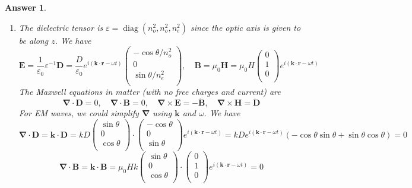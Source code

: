 \documentclass[a4paper]{article}
\DeclareMathOperator{\diag}{diag}
\newtheorem{ans}{Answer}[section]
\theoremstyle{new}
\begin{document}
\newpage
\begin{ans}\leavevmode
\begin{enumerate}[label=(\alph*)]
\item The dielectric tensor is $\varepsilon=\diag(n_o^2,n_o^2,n_e^2)$ since the optic axis is given to be along $z$. We have
$$\mathbf{E}=\frac{1}{\varepsilon_0}\varepsilon^{-1}\mathbf{D}=\frac{D}{\varepsilon_0}e^{i(\mathbf{k}\cdot\mathbf{r}-\omega t)}\begin{pmatrix}-\cos\theta/n_o^2\\0\\\sin\theta/n_e^2\\\end{pmatrix},\quad\mathbf{B}=\mu_0\mathbf{H}=\mu_0H\begin{pmatrix}0\\1\\0\\\end{pmatrix}e^{i(\mathbf{k}\cdot\mathbf{r}-\omega t)}$$
The Maxwell equations in matter (with no free charges and current) are
$$\boldsymbol{\nabla}\cdot\mathbf{D}=0,\quad\boldsymbol{\nabla}\cdot\mathbf{B}=0,\quad\boldsymbol{\nabla}\times\mathbf{E}=-\mathbf{\dot{B}},\quad\boldsymbol{\nabla}\times\mathbf{H}=\mathbf{\dot{D}}$$
For EM waves, we could simplify $\boldsymbol{\nabla}$ using $\mathbf{k}$ and $\omega$. We have
$$\boldsymbol{\nabla}\cdot\mathbf{D}=\mathbf{k}\cdot\mathbf{D}=kD\begin{pmatrix}\sin\theta\\0\\\cos\theta\\\end{pmatrix}\cdot\begin{pmatrix}-\cos\theta\\0\\\sin\theta\\\end{pmatrix}e^{i(\mathbf{k}\cdot\mathbf{r}-\omega t)}=kDe^{i(\mathbf{k}\cdot\mathbf{r}-\omega t)}(-\cos\theta\sin\theta+\sin\theta\cos\theta)=0$$
$$\boldsymbol{\nabla}\cdot\mathbf{B}=\mathbf{k}\cdot\mathbf{B}=\mu_0Hk\begin{pmatrix}\sin\theta\\0\\\cos\theta\\\end{pmatrix}\cdot\begin{pmatrix}0\\1\\0\\\end{pmatrix}e^{i(\mathbf{k}\cdot\mathbf{r}-\omega t)}=0$$

\end{enumerate}
\end{ans}
\end{document}
